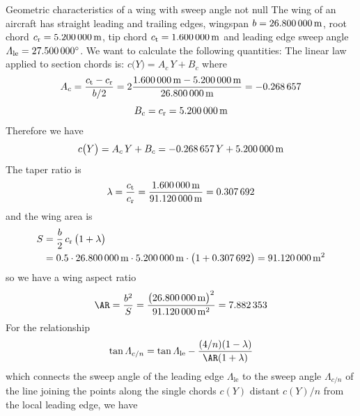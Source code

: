 \documentclass[[12pt,twoside]{book}
\begin{document}
\begin{myExampleX}{Geometric characteristics of a wing with sweep angle not null}{}%
\label{example:Geometric:Characteristics:Of:A:Wing:With:Sweep:Angle:Not:Null}
\noindent
The wing of an aircraft has straight leading and trailing edges, wingspan $b=\SI[round-precision=1]{\mySpanWingMT}{\metre}$,
root chord $c_\mathrm{r}=\SI[round-precision=2]{\myChordRootWingMT}{\metre}$, tip chord $c_\mathrm{t}=\SI[round-precision=2]{\myChordTipWingMT}{\metre}$
and leading edge sweep angle $\Lambda_\mathrm{le}=\SI[round-precision=1]{\myLambdaLEDeg}{\degree}$.
We want to calculate the following quantities:
\noindent
{}%
\medskip
The linear law applied to section chords is:
$c \big( Y \big) = A_c \, Y + B_c$ 
where
\[
A_c
  = \frac{c_\mathrm{t} - c_\mathrm{r}}{b/2}
  = 
    2 \frac{
      \SI[round-precision=2]{\myChordTipWingMT}{\metre} - \SI[round-precision=2]{\myChordRootWingMT}{\metre}
    }{
      \SI[round-precision=2]{\mySpanWingMT}{\metre}
    }
  = \SI[round-precision=3]{\myCoefficientA}{} 
\]
\[
B_c
  = c_\mathrm{r}
  =  \SI[round-precision=2]{\myCoefficientB}{\metre} 
\]
Therefore we have
\[
c \big( Y \big) = A_c \, Y + B_c
  = \SI[round-precision=3]{\myCoefficientA}{} \, Y
    + \SI[round-precision=2]{\myCoefficientB}{\metre}
\]
The taper ratio is
\[
\lambda
  =\frac{c_\mathrm{t}}{c_\mathrm{r}}
  =\frac{\SI[round-precision=2]{\myChordTipWingMT}{\metre}}{\SI[round-precision=2]{\myAreaWingMTsquared}{\metre}}
  =\SI[round-precision=2]{\myTaperRatioWing}{} 
\]
and the wing area is
\[
\begin{split}
S & {}= \frac{b}{2} \, c_\mathrm{r} \, \big( 1 + \lambda \big) \\
  & {}=
    \num{0.5} \cdot \SI[round-precision=1]{\mySpanWingMT}{\metre}
      \cdot \SI[round-precision=2]{\myChordRootWingMT}{\metre}
      \cdot \big( 1 + \SI[round-precision=2]{\myTaperRatioWing}{} \big) 
    = \SI[round-precision=1]{\myAreaWingMTsquared}{\metre^2} 
\end{split}
\]
so we have a wing aspect ratio
\[
\AR
  = \frac{b^2}{S}
  = \frac{\big(\SI[round-precision=1]{\mySpanWingMT}{\metre}\big)^2}{\SI[round-precision=1]{\myAreaWingMTsquared}{\metre^2}}
  = \num[round-precision=2]{\myAspectRatioWing} 
\]
For the relationship
\[
\tan\Lambda_{c/n} = \tan\Lambda_\mathrm{le}-\dfrac{(4/n)(1-\lambda)}{\AR(1+\lambda)}
\]
which connects the sweep angle of the leading edge $\Lambda_\mathrm{le}$  to the sweep angle $\Lambda_{c/n}$ of the line joining the points along the single chords $c(Y)$ distant $c(Y)/n$ from the local leading edge, we have

\end{myExampleX}
\end{document}
